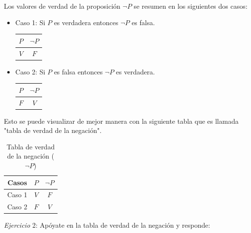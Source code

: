 \documentclass[letterpaper, twoside]{article}
\begin{document}
Los valores de verdad de la proposición $\neg P$ se resumen en los siguientes dos casos:
\begin{itemize}
  \item Caso 1: Si $P$ es verdadera entonces $\neg P$ es falsa.\par
  \vspace{.5cm}
  \begin{center}
    \begin{tabular}{|c|c|}
    \hline
    $P$ & $\neg P$ \\ \hline
    $V$ & $F$ \\
    \hline
  \end{tabular}
  \end{center}
  \vspace{.5cm}
  \item Caso 2: Si $P$ es falsa entonces $\neg P$ es verdadera.\par
  \vspace{.5cm}
  \begin{center}
    \begin{tabular}{|c|c|}
    \hline
    $P$ & $\neg P$ \\ \hline
    $F$ & $V$ \\
    \hline
  \end{tabular}
  \end{center}
\end{itemize}

\vspace{.5cm}

Esto se puede visualizar de mejor manera con la siguiente tabla que es llamada "tabla de verdad de la negación".


\begin{table}[h]
  \centering
    \begin{tabular}{|c|c|c|}
      \hline
      Casos  & $P$ & $\neg P$ \\ \hline
      Caso 1 & $V$ & $F$      \\ \hline
      Caso 2 & $F$ & $V$       \\
      \hline
    \end{tabular}
  \caption*{Tabla de verdad de la negación ($\neg P$)}
\end{table}

\vspace{1cm}

\textit{Ejercicio} 2: Apóyate en la tabla de verdad de la negación y responde:\par
\end{document}
